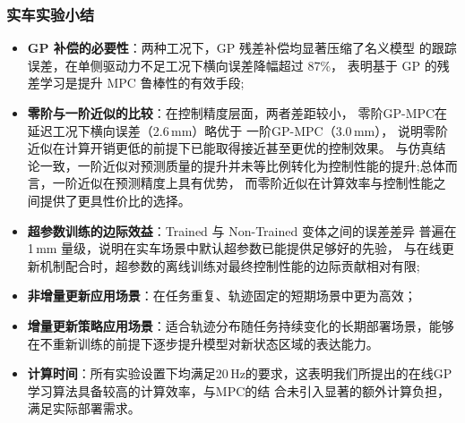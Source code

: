 \subsubsection{实车实验小结}
 
\begin{itemize}
    \item \textbf{GP 补偿的必要性}：两种工况下，GP 残差补偿均显著压缩了名义模型
的跟踪误差，在单侧驱动力不足工况下横向误差降幅超过 87\%，
表明基于 GP 的残差学习是提升 MPC 鲁棒性的有效手段;
    \item \textbf{零阶与一阶近似的比较}：在控制精度层面，两者差距较小，
零阶GP-MPC在延迟工况下横向误差（2.6\,mm）略优于 一阶GP-MPC（3.0\,mm），
说明零阶近似在计算开销更低的前提下已能取得接近甚至更优的控制效果。
与仿真结论一致，一阶近似对预测质量的提升并未等比例转化为控制性能的提升;总体而言，一阶近似在预测精度上具有优势，
而零阶近似在计算效率与控制性能之间提供了更具性价比的选择。
    \item \textbf{超参数训练的边际效益}：Trained 与 Non-Trained 变体之间的误差差异
普遍在 1\,mm 量级，说明在实车场景中默认超参数已能提供足够好的先验，
与在线更新机制配合时，超参数的离线训练对最终控制性能的边际贡献相对有限;
    \item \textbf{非增量更新应用场景}：在任务重复、轨迹固定的短期场景中更为高效；
    \item \textbf{增量更新策略应用场景}：适合轨迹分布随任务持续变化的长期部署场景，能够在不重新训练的前提下逐步提升模型对新状态区域的表达能力。
    \item \textbf{计算时间}：所有实验设置下均满足20\,Hz的要求，这表明我们所提出的在线GP学习算法具备较高的计算效率，与MPC的结
    合未引入显著的额外计算负担，满足实际部署需求。
\end{itemize}